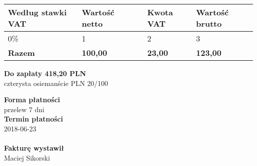 \documentclass[a4paper,10pt]{article}
\begin{document}
    \begin{table}[H]
    \raggedleft
    \begin{tabular}{| p{} | p{} | p{} | p{} | p{} |}
    \hline
    \textbf{Według stawki VAT} & \textbf{Wartość netto} & \cellcolor[gray]{0.9} & \textbf{Kwota VAT} & \textbf{Wartość brutto} \\ \hline
  
    {0}\% & {1} & \cellcolor[gray]{0.9} & {2} & {3} \\ \hline
  
  \hline
  {\textbf{Razem}}  & \textbf{100,00} & \cellcolor[gray]{0.9} & \textbf{23,00} & \textbf{123,00} \\ \hline
  \end{tabular}
  \end{table}

  \noindent
  \begin{flushright}
  \textbf{\LARGE{Do zapłaty} 418,20 PLN}\\
  czterysta osiemanście PLN 20/100
  \end{flushright}

  \vfill
  \noindent
  \textbf{Forma płatności}\\
  przelew 7 dni\\
  \textbf{Termin płatności}\\
  2018-06-23\\
  \\
  
  \noindent
    \textbf{Fakturę wystawił}\\
    Maciej Sikorski
    
\end{document}
